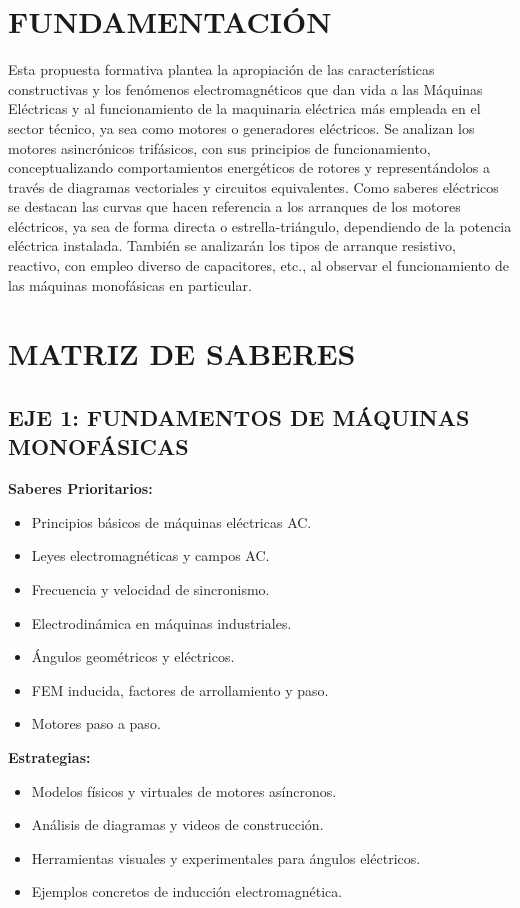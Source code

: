 
\section*{FUNDAMENTACIÓN}
Esta propuesta formativa plantea la apropiación de las características constructivas y los fenómenos electromagnéticos que dan vida a las Máquinas Eléctricas y al funcionamiento de la maquinaria eléctrica más empleada en el sector técnico, ya sea como motores o generadores eléctricos. Se analizan los motores asincrónicos trifásicos, con sus principios de funcionamiento, conceptualizando comportamientos energéticos de rotores y representándolos a través de diagramas vectoriales y circuitos equivalentes. Como saberes eléctricos se destacan las curvas que hacen referencia a los arranques de los motores eléctricos, ya sea de forma directa o estrella-triángulo, dependiendo de la potencia eléctrica instalada. También se analizarán los tipos de arranque resistivo, reactivo, con empleo diverso de capacitores, etc., al observar el funcionamiento de las máquinas monofásicas en particular.

\section*{MATRIZ DE SABERES}

\subsection*{EJE 1: FUNDAMENTOS DE MÁQUINAS MONOFÁSICAS}
\textbf{Saberes Prioritarios:}
\begin{itemize}
    \item Principios básicos de máquinas eléctricas AC.
    \item Leyes electromagnéticas y campos AC.
    \item Frecuencia y velocidad de sincronismo.
    \item Electrodinámica en máquinas industriales.
    \item Ángulos geométricos y eléctricos.
    \item FEM inducida, factores de arrollamiento y paso.
    \item Motores paso a paso.
\end{itemize}
\textbf{Estrategias:}
\begin{itemize}
    \item Modelos físicos y virtuales de motores asíncronos.
    \item Análisis de diagramas y videos de construcción.
    \item Herramientas visuales y experimentales para ángulos eléctricos.
    \item Ejemplos concretos de inducción electromagnética.
\end{itemize}

